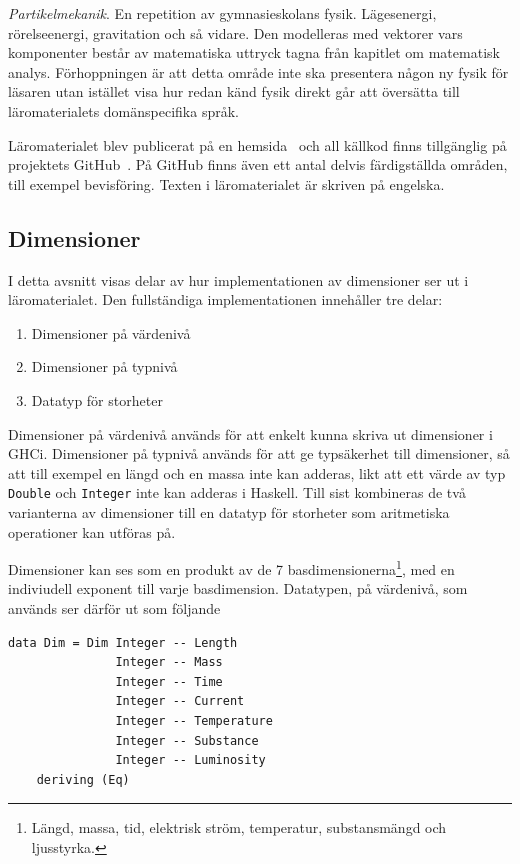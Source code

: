 \textit{Partikelmekanik}. En repetition av gymnasieskolans fysik.
Lägesenergi, rörelseenergi, gravitation och så vidare. Den modelleras med vektorer vars
komponenter består av matematiska uttryck tagna från kapitlet om matematisk
analys. Förhoppningen är att detta område inte ska presentera någon ny fysik för
läsaren utan istället visa hur redan känd fysik direkt går att översätta till
läromaterialets domänspecifika språk.

Läromaterialet blev publicerat på en hemsida~\cite{LYAP} och all källkod finns
tillgänglig på projektets GitHub~\cite{LYAP_repo}. På GitHub finns även ett
antal delvis färdigställda områden, till exempel bevisföring. Texten i
läromaterialet är skriven på engelska.

\subsection{Dimensioner}
\label{sec:grund_impl}

I detta avsnitt visas delar av hur implementationen av dimensioner ser ut i läromaterialet. Den fullständiga implementationen innehåller tre delar:

\begin{enumerate}
  \item Dimensioner på värdenivå
  \item Dimensioner på typnivå
  \item Datatyp för storheter
\end{enumerate}

Dimensioner på värdenivå används för att enkelt kunna skriva ut dimensioner i GHCi. Dimensioner på typnivå används för att ge typsäkerhet till dimensioner, så att till exempel en längd och en massa inte kan adderas, likt att ett värde av typ \texttt{Double} och \texttt{Integer} inte kan adderas i Haskell. Till sist kombineras de två varianterna av dimensioner till en datatyp för storheter som aritmetiska operationer kan utföras på.

Dimensioner kan ses som en produkt av de 7 basdimensionerna\footnote{Längd, massa, tid, elektrisk ström, temperatur, substansmängd och ljusstyrka.}, med en indiviudell exponent till varje basdimension. Datatypen, på värdenivå, som används ser därför ut som följande

\begin{lstlisting}[frame=none,belowskip=-0.5\baselineskip]
data Dim = Dim Integer -- Length
               Integer -- Mass
               Integer -- Time
               Integer -- Current
               Integer -- Temperature
               Integer -- Substance
               Integer -- Luminosity
    deriving (Eq)
\end{lstlisting}

